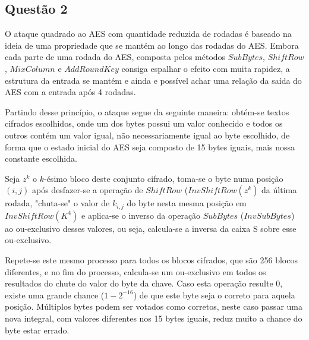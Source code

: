 \documentclass{article}
\begin{document}
\subsection*{Questão 2}
O ataque quadrado ao AES com quantidade reduzida de rodadas é baseado na ideia de uma propriedade que se mantém ao longo das rodadas do AES. Embora cada parte de uma rodada do AES, composta pelos métodos $SubBytes$, $ShiftRow$, $MixColumn$ e $AddRoundKey$ consiga espalhar o efeito com muita rapidez, a estrutura da entrada se mantém e ainda e possível achar uma relação da saída do AES com a entrada após 4 rodadas.

Partindo desse princípio, o ataque segue da seguinte maneira: obtém-se textos cifrados escolhidos, onde um dos bytes possui um valor conhecido e todos os outros contém um valor igual, não necessariamente igual ao byte escolhido, de forma que o estado inicial do AES seja composto de 15 bytes iguais, mais nossa constante escolhida.

Seja $z^{k}$ o $k$-ésimo bloco deste conjunto cifrado, toma-se o byte numa posição $(i, j)$ após desfazer-se a operação de $ShiftRow$ ($InvShiftRow(z^{k})$ da última rodada, "chuta-se" o valor de $k_{i,j}$ do byte nesta mesma posição em $InvShiftRow(K^{4})$ e aplica-se o inverso da operação $SubBytes$ ($InvSubBytes$) ao ou-exclusivo desses valores, ou seja, calcula-se a inversa da caixa S sobre esse ou-exclusivo.

Repete-se este mesmo processo para todos os blocos cifrados, que são 256 blocos diferentes, e no fim do processo, calcula-se um ou-exclusivo em todos os resultados do chute do valor do byte da chave. Caso esta operação resulte 0, existe uma grande chance ($1 - 2^{-16}$) de que este byte seja o correto para aquela posição. Múltiplos bytes podem ser votados como corretos, neste caso passar uma nova integral, com valores diferentes nos 15 bytes iguais, reduz muito a chance do byte estar errado.
\end{document}
